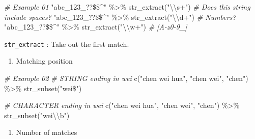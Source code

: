 \documentclass[
]{article}
\newenvironment{Shaded}{}{}
\newcommand{\CommentTok}[1]{\textcolor[rgb]{0.38,0.63,0.69}{\textit{#1}}}
\newcommand{\FunctionTok}[1]{\textcolor[rgb]{0.02,0.16,0.49}{#1}}
\newcommand{\NormalTok}[1]{#1}
\newcommand{\SpecialCharTok}[1]{\textcolor[rgb]{0.25,0.44,0.63}{#1}}
\newcommand{\StringTok}[1]{\textcolor[rgb]{0.25,0.44,0.63}{#1}}
\begin{document}
\begin{Shaded}
\begin{Highlighting}[]
\CommentTok{\# Example 01}
\StringTok{"abc\_123\_??\$\$\^{}"} \SpecialCharTok{\%\textgreater{}\%} \FunctionTok{str\_extract}\NormalTok{(}\StringTok{"}\SpecialCharTok{\textbackslash{}\textbackslash{}}\StringTok{s+"}\NormalTok{) }\CommentTok{\# Does this string include spaces? }
\StringTok{"abc\_123\_??\$\$\^{}"} \SpecialCharTok{\%\textgreater{}\%} \FunctionTok{str\_extract}\NormalTok{(}\StringTok{"}\SpecialCharTok{\textbackslash{}\textbackslash{}}\StringTok{d+"}\NormalTok{) }\CommentTok{\# Numbers? }
\StringTok{"abc\_123\_??\$\$\^{}"} \SpecialCharTok{\%\textgreater{}\%} \FunctionTok{str\_extract}\NormalTok{(}\StringTok{"}\SpecialCharTok{\textbackslash{}\textbackslash{}}\StringTok{w+"}\NormalTok{) }\CommentTok{\# [A{-}z0{-}9\_]}
\end{Highlighting}
\end{Shaded}

\texttt{str\_extract} : Take out the first match.

\begin{enumerate}
\def\labelenumi{\arabic{enumi}.}
\item
  Matching position
\end{enumerate}

\begin{Shaded}
\begin{Highlighting}[]
\CommentTok{\# Example 02}
\CommentTok{\# STRING ending in \textquotesingle{}wei\textquotesingle{}}
\FunctionTok{c}\NormalTok{(}\StringTok{"chen wei hua"}\NormalTok{, }\StringTok{"chen wei"}\NormalTok{, }\StringTok{"chen"}\NormalTok{) }\SpecialCharTok{\%\textgreater{}\%} \FunctionTok{str\_subset}\NormalTok{(}\StringTok{"wei\$"}\NormalTok{)}

\CommentTok{\# CHARACTER ending in \textquotesingle{}wei\textquotesingle{} }
\FunctionTok{c}\NormalTok{(}\StringTok{"chen wei hua"}\NormalTok{, }\StringTok{"chen wei"}\NormalTok{, }\StringTok{"chen"}\NormalTok{) }\SpecialCharTok{\%\textgreater{}\%} \FunctionTok{str\_subset}\NormalTok{(}\StringTok{"wei}\SpecialCharTok{\textbackslash{}\textbackslash{}}\StringTok{b"}\NormalTok{)}
\end{Highlighting}
\end{Shaded}

\begin{enumerate}
\def\labelenumi{\arabic{enumi}.}
\item
  Number of matches
\end{enumerate}
\end{document}
